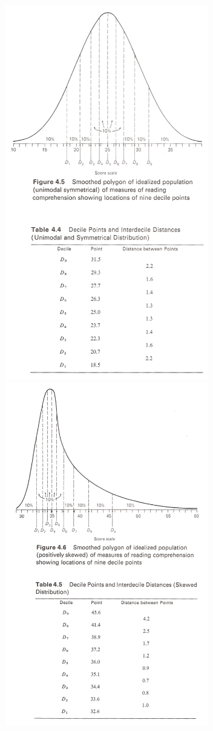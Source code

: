 \documentclass[12pt]{article}
\begin{document}
\includegraphics[width=3.5in]{Decile_Normal.png}
\includegraphics[width=3.5in]{Decile_Skew.png}\\
\end{document}
